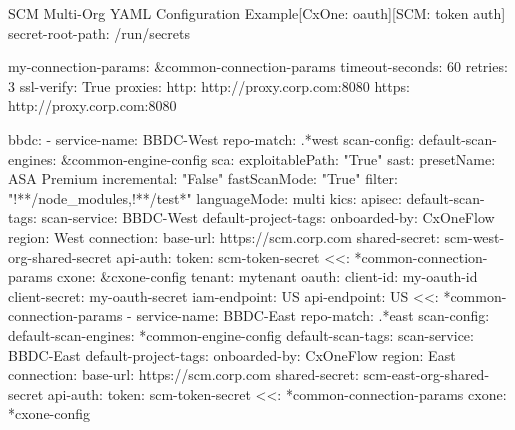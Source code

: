 \begin{code}{SCM Multi-Org YAML Configuration Example}{[CxOne: oauth]}{[SCM: token auth]}
secret-root-path: /run/secrets

my-connection-params: &common-connection-params
    timeout-seconds: 60
    retries: 3
    ssl-verify: True
    proxies:
    http: http://proxy.corp.com:8080
    https: http://proxy.corp.com:8080

bbdc:
    - service-name: BBDC-West
      repo-match: .*west
      scan-config: 
          default-scan-engines: &common-engine-config
              sca:
                  exploitablePath: "True"
              sast:
                  presetName: ASA Premium
                  incremental: "False"
                  fastScanMode: "True"
                  filter: "!**/node_modules,!**/test*"
                  languageMode: multi
              kics:
              apisec:
          default-scan-tags:
              scan-service: BBDC-West
          default-project-tags:
              onboarded-by: CxOneFlow
              region: West
      connection:
          base-url: https://scm.corp.com
          shared-secret: scm-west-org-shared-secret
          api-auth:
              token: scm-token-secret
          <<: *common-connection-params
      cxone: &cxone-config
          tenant: mytenant
          oauth:
              client-id: my-oauth-id
              client-secret: my-oauth-secret
          iam-endpoint: US
          api-endpoint: US
          <<: *common-connection-params
    - service-name: BBDC-East
      repo-match: .*east
      scan-config: 
          default-scan-engines: *common-engine-config
          default-scan-tags:
              scan-service: BBDC-East
          default-project-tags:
              onboarded-by: CxOneFlow
              region: East
      connection:
          base-url: https://scm.corp.com
          shared-secret: scm-east-org-shared-secret
          api-auth:
              token: scm-token-secret
          <<: *common-connection-params
      cxone: *cxone-config
\end{code}

